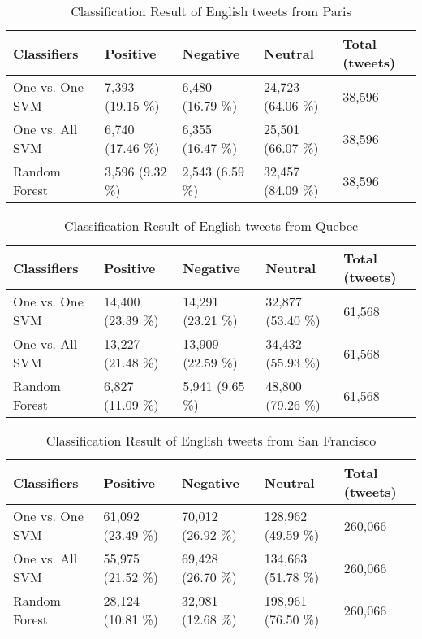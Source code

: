 \begin{table}[ht]
	\caption{Classification Result of English tweets from Paris}
	\begin{tabular}{|l|p{1.8cm}|p{1.8cm}|p{1.8cm}|p{1.8cm}|} \hline
	Classifiers & Positive & Negative & Neutral & Total (tweets)\\ \hline
One vs. One SVM & 7,393 (19.15  \%)& 6,480 (16.79  \%)& 24,723 (64.06 \%)& 38,596 \\ \hline
One vs. All SVM & 6,740 (17.46 \%)& 6,355 (16.47 \%)& 25,501 (66.07 \%)& 38,596 \\ \hline
Random Forest   & 3,596 (9.32 \%)& 2,543 (6.59 \%)& 32,457 (84.09 \%)& 38,596 \\ \hline
	\end{tabular}
	\label{tab:result_paris_en}
\end{table}

\begin{table}[ht]
	\caption{Classification Result of English tweets from Quebec}
	\begin{tabular}{|l|p{1.8cm}|p{1.8cm}|p{1.8cm}|p{1.8cm}|} \hline
	Classifiers & Positive & Negative & Neutral & Total (tweets)\\ \hline
	One vs. One SVM & 14,400 (23.39 \%)& 14,291 (23.21 \%)& 32,877 (53.40 \%)& 61,568 \\ \hline
	One vs. All SVM & 13,227 (21.48 \%)& 13,909 (22.59 \%)& 34,432 (55.93 \%)& 61,568 \\ \hline
	Random Forest   & 6,827 (11.09 \%) & 5,941 (9.65 \%) & 48,800 (79.26 \%)& 61,568 \\ \hline
	\end{tabular}
	\label{tab:result_quebec_en}
\end{table}


\begin{table}[ht]
	\caption{Classification Result of English tweets from San Francisco}
	\begin{tabular}{|l|p{1.8cm}|p{1.8cm}|p{1.8cm}|p{1.8cm}|} \hline
	Classifiers & Positive & Negative & Neutral & Total (tweets)\\ \hline
	
	One vs. One SVM & 61,092 (23.49 \%)& 70,012 (26.92 \%)& 128,962 (49.59 \%)& 260,066 \\ \hline
	One vs. All SVM & 55,975 (21.52 \%)& 69,428 (26.70 \%)& 134,663 (51.78 \%)& 260,066 \\ \hline
	Random Forest   & 28,124 (10.81 \%)& 32,981 (12.68 \%)& 198,961 (76.50 \%)& 260,066 \\ \hline
	\end{tabular}
	\label{tab:result_sf_en}
\end{table}


